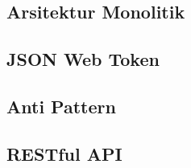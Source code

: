 \subsection{Arsitektur Monolitik}

\subsection{JSON Web Token}

\subsection{Anti Pattern}

\subsection{RESTful API}

